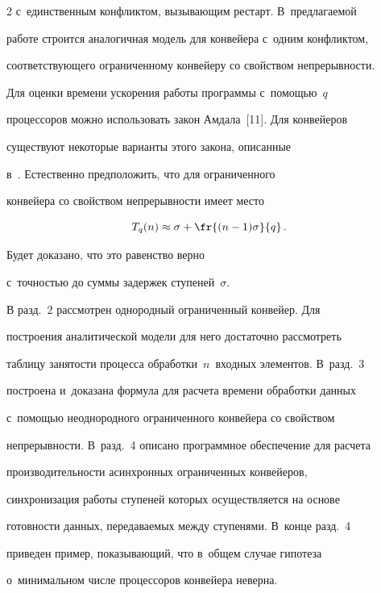 \begin{multicols}{2}
с~единственным конфликтом, вызывающим ре\-старт. В~предлагаемой 


работе строится аналогичная модель для конвейера с~одним конфликтом, 


соответствующего ограниченному конвейеру со свойством непрерывности. 


  


  Для оценки времени ускорения работы программы с~помощью~$q$ 


процессоров можно использовать закон Амдала~[11]. Для конвейеров 


существуют некоторые варианты этого закона, описанные 


в~\cite[п.~1.4.1.3]{12-h}. Естественно предположить, что для ограниченного 


конвейера со свойством непрерывности имеет место 


$$


T_q(n)\approx 


\sigma+ \fr{(n-1)\sigma}{q}\,.


$$





 Будет доказано, что это равенство верно 


с~точностью до суммы задержек ступеней~$\sigma$. 


  


  В разд.~2 рассмотрен однородный ограниченный конвейер. Для 


построения аналитической модели для него достаточно рассмотреть 


таблицу занятости процесса обработки~$n$~входных элементов. В~разд.~3 


построена и~доказана формула для расчета времени обработки данных 


с~помощью неоднородного ограниченного конвейера со свойством 


непрерывности. В~разд.~4 описано программное обеспечение для расчета 


производительности асинхронных ограниченных конвейеров, 


синхронизация работы ступеней которых осуществляется на основе 


готовности данных, передаваемых между ступенями. В~конце разд.~4 


приведен пример, показывающий, что в~общем случае гипотеза 


о~минимальном числе процессоров конвейера неверна. 



\end{multicols}
